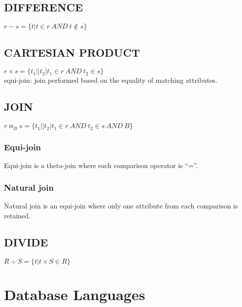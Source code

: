 \documentclass[a4paper]{scrartcl}
\newcommand{\set}[2]{\{#1|#2\}}
\begin{document}
  \subsection{DIFFERENCE}
    $r - s = \set{t}{t \in r~AND~ t \notin s}$
  \subsection{CARTESIAN PRODUCT}
    $r \times s = \set{t_1 || t_2}{t_1 \in r~AND~t_2 \in s}$\\
    equi-join: join performed based on the equality of matching attributes.
  \subsection{JOIN}
    $r \bowtie_B s = \set{t_1 || t_2}{t_1 \in r~AND~t_2 \in s ~AND~B}$\\
    \subsubsection{Equi-join}
      Equi-join is a theta-join where each comparison operator is “=”.
    \subsubsection{Natural join}
      Natural join is an equi-join where only one attribute from each comparison is retained.
  \subsection{DIVIDE}
    $R \div S = \set{t}{t \times S \in R}$

\section{Database Languages}
\end{document}
